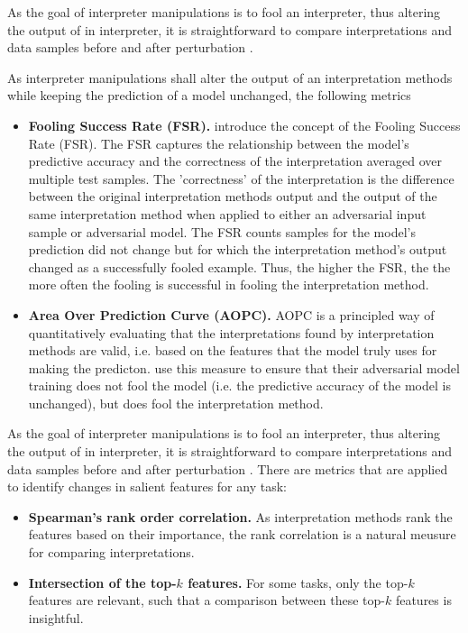 As the goal of interpreter manipulations is to fool an interpreter, thus altering the output of in interpreter, it is straightforward to compare interpretations and data samples before and after perturbation \cite{ghorbani2019interpretation}.

As interpreter manipulations shall alter the output of an interpretation methods while keeping the prediction of a model unchanged, the following metrics 

\begin{itemize}
    \item \textbf{Fooling Success Rate (FSR).} \cite{fooling_nn_interpreters} introduce the concept of the Fooling Success Rate (FSR). The FSR captures the relationship between the model's predictive accuracy and the correctness of the interpretation averaged over multiple test samples. The 'correctness' of the interpretation is the difference between the original interpretation methods output and the output of the same interpretation method when applied to either an adversarial input sample or adversarial model. 
    The FSR counts samples for the model's prediction did not change but for which the interpretation method's output changed as a successfully fooled example. Thus, the higher the FSR, the the more often the fooling is successful in fooling the interpretation method. 
    \item \textbf{Area Over Prediction Curve (AOPC). } AOPC \cite{samek2016evaluating} is a principled way of quantitatively evaluating that the interpretations found by interpretation methods are valid, i.e. based on the features that the model truly uses for making the predicton. \cite{fooling_nn_interpreters} use this measure to ensure that their adversarial model training does not fool the model (i.e. the predictive accuracy of the model is unchanged), but does fool the interpretation method.
\end{itemize}

As the goal of interpreter manipulations is to fool an interpreter, thus altering the output of in interpreter, it is straightforward to compare interpretations and data samples before and after perturbation \cite{ghorbani2019interpretation}.
There are metrics that are applied to identify changes in salient features for any task:
\begin{itemize}
    \item \textbf{Spearman's rank order correlation.} As interpretation methods rank the features based on their importance, the rank correlation \cite{spearman1961proof} is a natural meusure for comparing interpretations. 
    \item \textbf{Intersection of the top-$k$ features.} For some tasks, only the top-$k$ features are relevant, such that a comparison between these top-$k$ features is insightful. 
\end{itemize}

